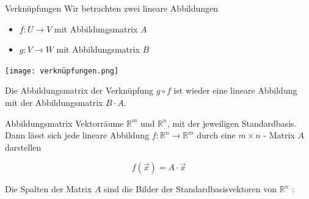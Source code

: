 \begin{theorem}{Verknüpfungen}
    Wir betrachten zwei lineare Abbildungen
    \begin{itemize}
    \item $f: U \rightarrow V$ mit Abbildungsmatrix $A$
    \item $g: V \rightarrow W$ mit Abbildungsmatrix $B$
    \end{itemize}
    \begin{center}
    \texttt{[image: verknüpfungen.png]}\\
    \end{center}
    Die Abbildungsmatrix der Verknüpfung $g \circ f$ ist wieder eine lineare Abbildung mit der Abbildungsmatrix $B \cdot A$.
\end{theorem}

\begin{definition}{Abbildungsmatrix}
    Vektorräume $\mathbb{R}^{m}$ und $\mathbb{R}^{n}$, mit der jeweiligen Standardbasis. Dann lässt sich jede lineare Abbildung $f: \mathbb{R}^{n} \rightarrow \mathbb{R}^{m}$ durch eine $m \times n$ - Matrix $A$ darstellen

    $$
    f(\vec{x})=A \cdot \vec{x}
    $$

    Die Spalten der Matrix $A$ sind die Bilder der Standardbasisvektoren von $\mathbb{R}^{n}$ :

    \begin{center}
    \end{center}
\end{definition}

